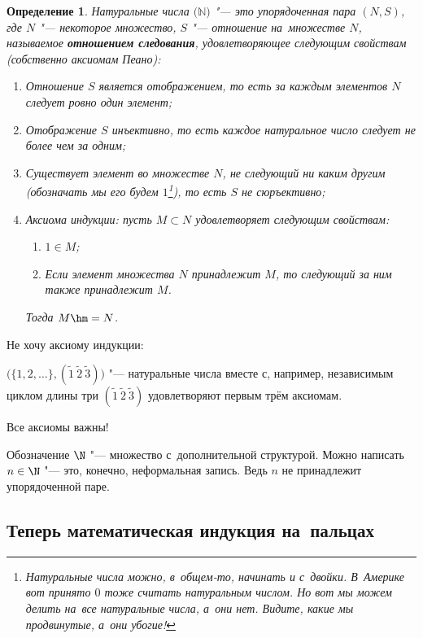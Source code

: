 \documentclass[a4paper,10pt,twoside]{article}
\newtheorem{Def}{Определение}[section]
\begin{document}
\begin{Def}
    Натуральные числа $\big(\mathbb{N}\big)$ "--- это упорядоченная пара $(N,S)$, где $N$ "--- некоторое множество, $S$ "--- отношение
     на~множестве $N$, называемое \textbf{отношением следования}, удовлетворяющее следующим свойствам (собственно аксиомам Пеано):

    \begin{enumerate}
        \item Отношение $S$ является отображением, то есть за каждым элементов $N$ следует ровно один элемент;

        \item Отображение $S$ инъективно, то есть каждое натуральное число следует не более чем за одним;

        \item Существует элемент во множестве $N$, не следующий ни каким другим (обозначать мы его будем
            $1$\footnote{Натуральные числа можно, в~общем-то, начинать и с~двойки. 
            В~Америке вот принято $0$ тоже считать натуральным числом. 
            Но вот мы можем делить на~все натуральные числа, а~они нет. 
            Видите, какие мы продвинутые, а~они убогие!}), то есть $S$ не сюръективно;



        \item\label{Induct} Аксиома индукции: пусть $M\subset N$ удовлетворяет следующим свойствам:
            \begin{enumerate}
                \item $1\in M$;
                \item Если элемент множества $N$ принадлежит $M$, то следующий за ним также принадлежит $M$.
            \end{enumerate}
            Тогда $M\hm=N$.
    \end{enumerate}
\end{Def}

Не хочу аксиому индукции:

$\Big(\{1,2,\ldots\},(\tilde1\ \tilde 2\ \tilde 3)\Big)$ "--- натуральные числа вместе с, например, независимым циклом
длины три $(\tilde 1\ \tilde2\ \tilde3)$ удовлетворяют первым трём аксиомам.

Все аксиомы важны!

Обозначение $\N$ "--- множество с~дополнительной структурой. Можно написать $n\in \N$ "--- это, конечно,
 неформальная запись. Ведь $n$ не принадлежит упорядоченной паре.

\subsection{Теперь математическая индукция на~пальцах}
\end{document}
